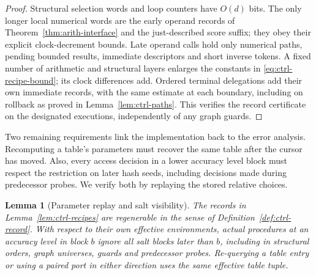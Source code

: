 \documentclass[11pt]{article}
\numberwithin{equation}{section}
\newtheorem{lemma}[theorem]{Lemma}
\theoremstyle{definition}
\theoremstyle{remark}
\begin{document}
\begin{proof}
Structural selection words and loop counters have $O(d)$ bits.  The
only longer local numerical words are the early operand records of
Theorem~\ref{thm:arith-interface} and the just-described score suffix;
they obey their explicit clock-decrement bounds.  Late operand calls
hold only numerical paths, pending bounded results, immediate
descriptors and short inverse tokens.  A fixed number of arithmetic and
structural layers enlarges the constants in
\eqref{eq:ctrl-recipe-bound}; its clock differences add.  Ordered
terminal delegations add their own immediate records, with the same
estimate at each boundary, including on rollback as proved in
Lemma~\ref{lem:ctrl-paths}.  This verifies the record certificate on
the designated executions, independently of any graph guards.
\end{proof}

Two remaining requirements link the implementation back to the error analysis. Recomputing a table's parameters must recover the same table after the cursor has moved. Also, every access decision in a lower accuracy level block must respect the restriction on later hash seeds, including decisions made during predecessor probes. We verify both by replaying the stored relative choices.

\begin{lemma}[Parameter replay and salt visibility]\label{lem:ctrl-replay}
The records in Lemma~\ref{lem:ctrl-recipes} are regenerable in the sense
of Definition~\ref{def:ctrl-record}.  With respect to their own effective
environments, actual procedures at an accuracy level in block $b$ ignore all salt
blocks later than $b$, including in structural orders, graph universes,
guards and predecessor probes.  Re-querying a
table entry or using a paired port in either direction uses the same
effective table tuple.
\end{lemma}
\end{document}
